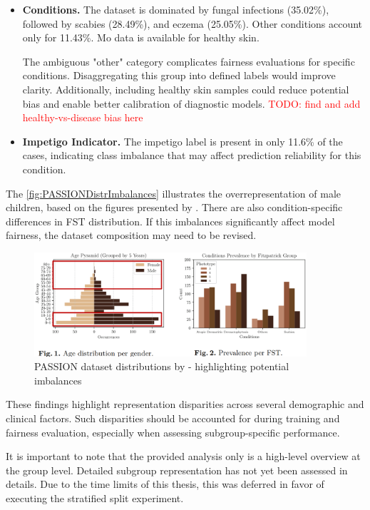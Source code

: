 \documentclass[12pt, a4paper, oneside]{book}   	%
\renewcommand{\todo}[1]{\textcolor{red}{TODO: #1}}
\begin{document}
\begin{itemize}
			\item \textbf{Conditions.} The dataset is dominated by fungal infections (35.02\%), followed by scabies (28.49\%), and eczema (25.05\%). Other conditions account only for 11.43\%. Mo data is available for healthy skin.
			
			The ambiguous "other" category complicates fairness evaluations for specific conditions. Disaggregating this group into defined labels would improve clarity. Additionally, including healthy skin samples could reduce potential bias and enable better calibration of diagnostic models. \todo{find and add healthy-vs-disease bias here}
			
			\item \textbf{Impetigo Indicator.} The impetigo label is present in only 11.6\% of the cases, indicating class imbalance that may affect prediction reliability for this condition.
		\end{itemize}
		
		The \autoref{fig:PASSIONDistrImbalances} illustrates the overrepresentation of male children, based on the figures presented by \textcite{Gottfrois2024}. There are also condition-specific differences in \gls{FST} distribution. If this imbalances significantly affect model fairness, the dataset composition may need to be revised.
		
		\begin{figure}[H]
			\centering
			\includegraphics[width=0.9\textwidth]{figures/PASSIONDatasetDistributionPotentialImbalances.png}
			\caption{PASSION dataset distributions by \textcite{Gottfrois2024} - highlighting potential imbalances}
			\label{fig:PASSIONDistrImbalances}
		\end{figure}
		
		These findings highlight representation disparities across several demographic and clinical factors. Such disparities should be accounted for during training and fairness evaluation, especially when assessing subgroup-specific performance.
		
		It is important to note that the provided analysis only is a high-level overview at the group level. Detailed subgroup representation has not yet been assessed in details. Due to the time limits of this thesis, this was deferred in favor of executing the stratified split experiment.
		
\end{document}
